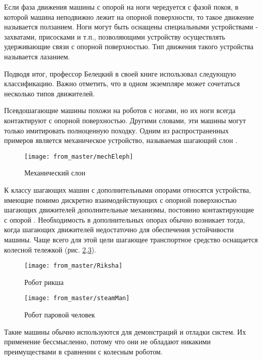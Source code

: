 Если фаза движения машины с опорой на ноги чередуется с фазой покоя, в которой машина неподвижно лежит на опорной поверхности, то такое движение называется ползанием. Ноги могут быть оснащены специальными устройствами - захватами, присосками и т.п., позволяющими устройству осуществлять удерживающие связи с опорной поверхностью. Тип движения такого устройства называется лазанием.

Подводя итог, профессор Белецкий в своей книге использовал следующую классификацию. Важно отметить, что в одном экземпляре может сочетаться несколько типов движителей.

Псевдошагающие машины похожи на роботов с ногами, но их ноги всегда контактируют с опорной поверхностью. Другими словами, эти машины могут только имитировать полноценную походку. Одним из распространенных примеров является механическое устройство, называемая шагающий слон .


\begin{figure}[H]
\centering\texttt{[image: from\_master/mechEleph]}
\caption{Механический слон}
\label{fig:mechEleph}
\end{figure}

К классу шагающих машин с дополнительными опорами относятся устройства, имеющие помимо дискретно взаимодействующих с опорной поверхностью шагающих движителей дополнительные механизмы, постоянно контактирующие с опорой \cite{Maloletov2015dinamica}. Необходимость в дополнительных опорах обычно возникает тогда, когда шагающих движителей недостаточно для обеспечения устойчивости машины. Чаще всего для этой цели шагающее транспортное средство оснащается колесной тележкой (рис. \ref{fig:Riksha},\ref{fig:steamMan})\cite{briskinSintezCiklovogoShagayushchego2011, Petr1986, Brisk2009,2014,2019,Pavl2013}.

\begin{figure}[H]
\centering\texttt{[image: from\_master/Riksha]}
\caption{Робот рикша}
\label{fig:Riksha}
\end{figure}

\begin{figure}[H]
\centering\texttt{[image: from\_master/steamMan]}
\caption{Робот паровой человек}
\label{fig:steamMan}
\end{figure}

Такие машины обычно используются для демонстраций и отладки систем. Их применение бессмысленно, потому что они не обладают никакими преимуществами в сравнении с колесным роботом. 


